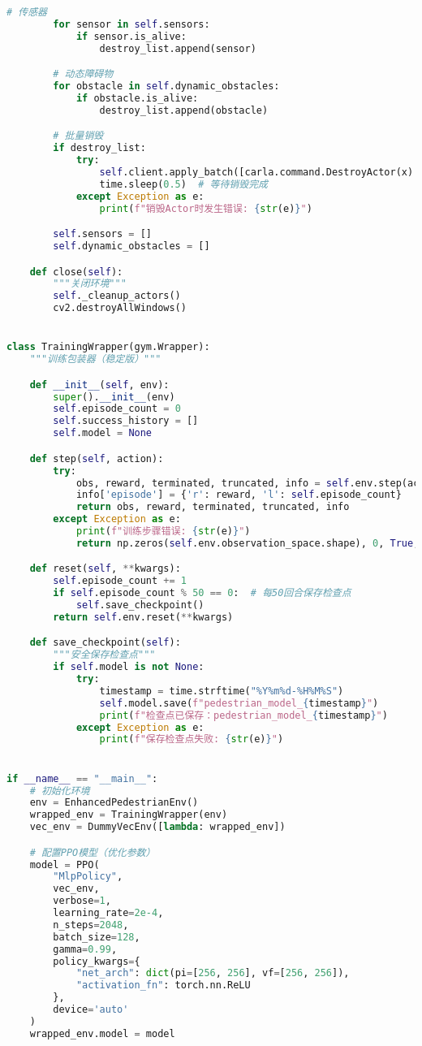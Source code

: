 \begin{lstlisting}[language=Python]
        # 传感器
        for sensor in self.sensors:
            if sensor.is_alive:
                destroy_list.append(sensor)

        # 动态障碍物
        for obstacle in self.dynamic_obstacles:
            if obstacle.is_alive:
                destroy_list.append(obstacle)

        # 批量销毁
        if destroy_list:
            try:
                self.client.apply_batch([carla.command.DestroyActor(x) for x in destroy_list])
                time.sleep(0.5)  # 等待销毁完成
            except Exception as e:
                print(f"销毁Actor时发生错误: {str(e)}")

        self.sensors = []
        self.dynamic_obstacles = []

    def close(self):
        """关闭环境"""
        self._cleanup_actors()
        cv2.destroyAllWindows()


class TrainingWrapper(gym.Wrapper):
    """训练包装器（稳定版）"""

    def __init__(self, env):
        super().__init__(env)
        self.episode_count = 0
        self.success_history = []
        self.model = None

    def step(self, action):
        try:
            obs, reward, terminated, truncated, info = self.env.step(action)
            info['episode'] = {'r': reward, 'l': self.episode_count}
            return obs, reward, terminated, truncated, info
        except Exception as e:
            print(f"训练步骤错误: {str(e)}")
            return np.zeros(self.env.observation_space.shape), 0, True, False, {}

    def reset(self, **kwargs):
        self.episode_count += 1
        if self.episode_count % 50 == 0:  # 每50回合保存检查点
            self.save_checkpoint()
        return self.env.reset(**kwargs)

    def save_checkpoint(self):
        """安全保存检查点"""
        if self.model is not None:
            try:
                timestamp = time.strftime("%Y%m%d-%H%M%S")
                self.model.save(f"pedestrian_model_{timestamp}")
                print(f"检查点已保存：pedestrian_model_{timestamp}")
            except Exception as e:
                print(f"保存检查点失败: {str(e)}")


if __name__ == "__main__":
    # 初始化环境
    env = EnhancedPedestrianEnv()
    wrapped_env = TrainingWrapper(env)
    vec_env = DummyVecEnv([lambda: wrapped_env])

    # 配置PPO模型（优化参数）
    model = PPO(
        "MlpPolicy",
        vec_env,
        verbose=1,
        learning_rate=2e-4,
        n_steps=2048,
        batch_size=128,
        gamma=0.99,
        policy_kwargs={
            "net_arch": dict(pi=[256, 256], vf=[256, 256]),
            "activation_fn": torch.nn.ReLU
        },
        device='auto'
    )
    wrapped_env.model = model


\end{lstlisting}
